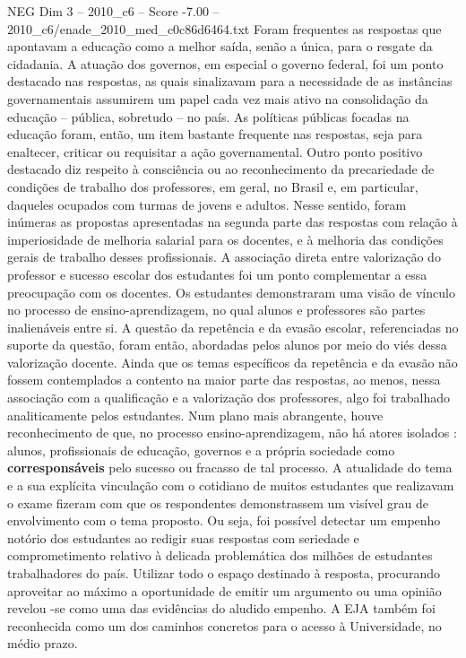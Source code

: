 \begin{textsample}{NEG Dim 3 – 2010\_c6 – Score -7.00 – 2010\_c6/enade\_2010\_med\_c0c86d6464.txt}
Foram frequentes as respostas que apontavam a educação como a melhor saída, senão a única, para o resgate da cidadania.
A atuação dos governos, em especial o governo federal, foi um ponto destacado nas respostas, as quais sinalizavam para a necessidade de as instâncias governamentais assumirem um papel cada vez mais ativo na consolidação da educação – pública, sobretudo – no país.
As políticas públicas focadas na educação foram, então, um item bastante frequente nas respostas, seja para enaltecer, criticar ou requisitar a ação governamental.
Outro ponto positivo destacado diz respeito à consciência ou ao reconhecimento da precariedade de condições de trabalho dos professores, em geral, no Brasil e, em particular, daqueles ocupados com turmas de jovens e adultos.
Nesse sentido, foram inúmeras as propostas apresentadas na segunda parte das respostas com relação à imperiosidade de melhoria salarial para os docentes, e à melhoria das condições gerais de trabalho desses profissionais.
A associação direta entre valorização do professor e sucesso escolar dos estudantes foi um ponto complementar a essa preocupação com os docentes.
Os estudantes demonstraram uma visão de vínculo no processo de ensino-aprendizagem, no qual alunos e professores são partes inalienáveis entre si.
A questão da repetência e da evasão escolar, referenciadas no suporte da questão, foram então, abordadas pelos alunos por meio do viés dessa valorização docente.
Ainda que os temas específicos da repetência e da evasão não fossem contemplados a contento na maior parte das respostas, ao menos, nessa associação com a qualificação e a valorização dos professores, algo foi trabalhado analiticamente pelos estudantes.
Num plano mais abrangente, houve reconhecimento de que, no processo ensino-aprendizagem, não há atores isolados : alunos, profissionais de educação, governos e a própria sociedade como \textbf{corresponsáveis} pelo sucesso ou fracasso de tal processo.
A atualidade do tema e a sua explícita vinculação com o cotidiano de muitos estudantes que realizavam o exame fizeram com que os respondentes demonstrassem um visível grau de envolvimento com o tema proposto.
Ou seja, foi possível detectar um empenho notório dos estudantes ao redigir suas respostas com seriedade e comprometimento relativo à delicada problemática dos milhões de estudantes trabalhadores do país.
Utilizar todo o espaço destinado à resposta, procurando aproveitar ao máximo a oportunidade de emitir um argumento ou uma opinião revelou -se como uma das evidências do aludido empenho.
A EJA também foi reconhecida como um dos caminhos concretos para o acesso à Universidade, no médio prazo.

\end{textsample}
